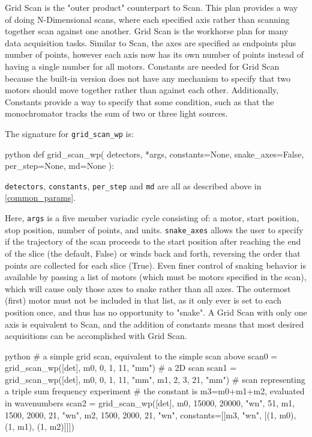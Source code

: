 Grid Scan is the "outer product" counterpart to Scan.
This plan provides a way of doing N-Dimensional scans, where each specified axis rather than scanning together scan against one another.
Grid Scan is the workhorse plan for many data acquisition tasks.
Similar to Scan, the axes are specified as endpoints plus number of points, however each axis now has its own number of points instead of having a single number for all motors.
Constants are needed for Grid Scan because the built-in version does not have any mechanism to specify that two motors should move together rather than against each other.
Additionally, Constants provide a way to specify that some condition, such as that the monochromator tracks the sum of two or three light sources.

The signature for \texttt{grid\_scan\_wp} is:

\begin{codefragment}{python}
def grid_scan_wp(
    detectors, *args, constants=None, snake_axes=False, per_step=None, md=None
):
\end{codefragment}

\texttt{detectors}, \texttt{constants}, \texttt{per\_step} and \texttt{md} are all as described above in \ref{common_params}.

Here, \texttt{args} is a five member variadic cycle consisting of: a motor, start position, stop position, number of points, and units.
\texttt{snake\_axes} allows the user to specify if the trajectory of the scan proceeds to the start position after reaching the end of the slice (the default, False) or winds back and forth, reversing the order that points are collected for each slice (True).
Even finer control of snaking behavior is available by passing a list of motors (which must be motors specified in the scan), which will cause only those axes to snake rather than all axes.
The outermost (first) motor must not be included in that list, as it only ever is set to each position once, and thus has no opportunity to "snake".
A Grid Scan with only one axis is equivalent to Scan, and the addition of constants means that most desired acquisitions can be accomplished with Grid Scan.

\begin{codefragment}{python}
# a simple grid scan, equivalent to the simple scan above
scan0 = grid_scan_wp([det], m0, 0, 1, 11, "mm")
# a 2D scan
scan1 = grid_scan_wp([det], m0, 0, 1, 11, "mm",
                            m1, 2, 3, 21, "mm")
# scan representing a triple sum frequency experiment
# the constant is m3=m0+m1+m2, evaluated in wavenumbers
scan2 = grid_scan_wp([det], m0, 15000, 20000, "wn", 51,
                            m1, 1500, 2000, 21, "wn",
                            m2, 1500, 2000, 21, "wn",
                            constants=[[m3, "wn", [(1, m0), (1, m1), (1, m2)]]])
\end{codefragment}


